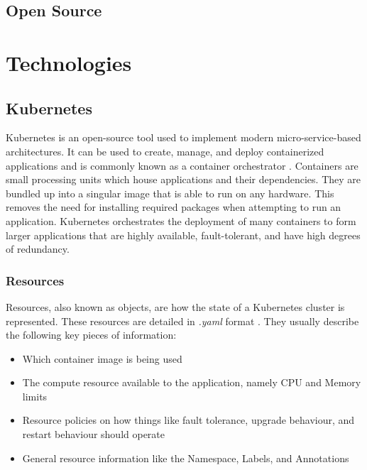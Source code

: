 \documentclass{article}
\begin{document}
\subsection{Open Source} \label{open-source}



\section{Technologies} \label{technologies} 



\subsection{Kubernetes}

Kubernetes is an open-source tool used to implement modern micro-service-based architectures. It can be used to create, manage, and deploy containerized applications and is commonly known as a container orchestrator \cite{k8s-overview}. Containers are small processing units which house applications and their dependencies. They are bundled up into a singular image that is able to run on any hardware. This removes the need for installing required packages when attempting to run an application. Kubernetes orchestrates the deployment of many containers to form larger applications that are highly available, fault-tolerant, and have high degrees of redundancy.



\subsubsection{Resources} \label{resources}

Resources, also known as objects, are how the state of a Kubernetes cluster is represented. These resources are detailed in \emph{.yaml} format \cite{k8s-obj}. They usually describe the following key pieces of information:

\begin{itemize}
    \itemsep0em 
    \item Which container image is being used
    \item The compute resource available to the application, namely CPU and Memory limits
    \item Resource policies on how things like fault tolerance, upgrade behaviour, and restart behaviour should operate
    \item General resource information like the Namespace, Labels, and Annotations
\end{itemize}
\end{document}
